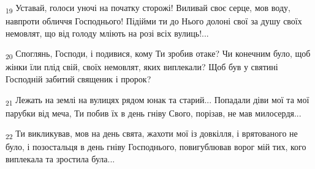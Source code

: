 \begin{tcolorbox}
\textsubscript{19} Уставай, голоси уночі на початку сторожі! Виливай своє серце, мов воду, навпроти обличчя Господнього! Підійми ти до Нього долоні свої за душу своїх немовлят, що від голоду мліють на розі всіх вулиць!...
\end{tcolorbox}
\begin{tcolorbox}
\textsubscript{20} Споглянь, Господи, і подивися, кому Ти зробив отаке? Чи конечним було, щоб жінки їли плід свій, своїх немовлят, яких виплекали? Щоб був у святині Господній забитий священик і пророк?
\end{tcolorbox}
\begin{tcolorbox}
\textsubscript{21} Лежать на землі на вулицях рядом юнак та старий... Попадали діви мої та мої парубки від меча, Ти побив їх в день гніву Свого, порізав, не мав милосердя...
\end{tcolorbox}
\begin{tcolorbox}
\textsubscript{22} Ти викликував, мов на день свята, жахоти мої із довкілля, і врятованого не було, і позостальця в день гніву Господнього, повигублював ворог мій тих, кого виплекала та зростила була...
\end{tcolorbox}
